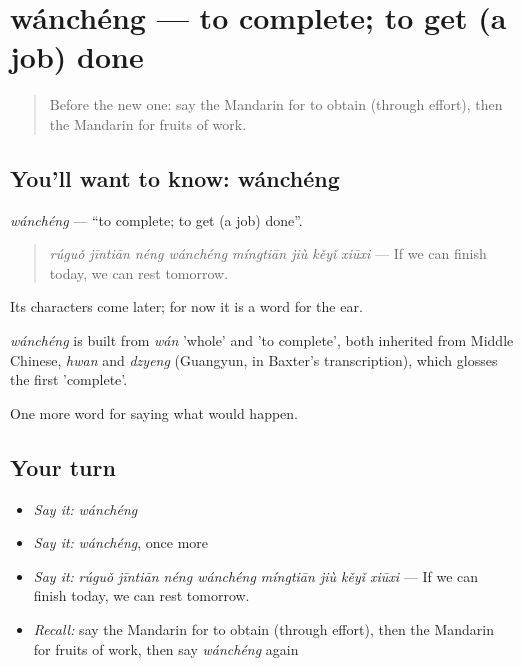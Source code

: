 \section[wánchéng]{wánchéng — to complete; to get (a job) done}

\label{lesson:ZH-C395-wancheng}



\begin{quote}
Before the new one: say the Mandarin for to obtain (through effort), then the Mandarin for fruits of work.
\end{quote}

\subsection*{You'll want to know: wánchéng}
\emph{wánchéng} — \textquotedblleft{}to complete; to get (a job) done\textquotedblright{}.

\begin{quote}
\emph{rúguǒ jīntiān néng wánchéng míngtiān jiù kěyǐ xiūxi} — If we can finish today, we can rest tomorrow.
\end{quote}

Its characters come later; for now it is a word for the ear.

\begin{cousinweb}
\emph{wánchéng} is built from \emph{wán} 'whole' and  'to complete', both inherited from Middle Chinese, \emph{hwan} and \emph{dzyeng} (Guangyun, in Baxter's transcription), which glosses the first 'complete'.
\end{cousinweb}

\begin{grammarlens}[title={What you've built}]
One more word for saying what would happen.
\end{grammarlens}

\subsection*{Your turn}
\begin{itemize}
\raggedright
  \item \emph{Say it:} \emph{wánchéng}
  \item \emph{Say it:} \emph{wánchéng}, once more
  \item \emph{Say it:} \emph{rúguǒ jīntiān néng wánchéng míngtiān jiù kěyǐ xiūxi} — If we can finish today, we can rest tomorrow.
  \item \emph{Recall:} say the Mandarin for to obtain (through effort), then the Mandarin for fruits of work, then say \emph{wánchéng} again
\end{itemize}

